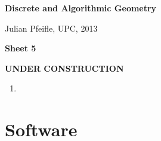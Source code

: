 \documentclass[11pt]{amsart}
\begin{document}
\begin{center}
\textbf{\sffamily
   Discrete and Algorithmic Geometry }

\medskip
   Julian Pfeifle,
   UPC, 2013 \mbox{}
\end{center}

\bigskip

\begin{center}
  \textbf{\sffamily Sheet 5}

\bigskip
\textbf{\sffamily UNDER CONSTRUCTION}

\end{center}

\bigskip




\begin{enumerate}
\setlength{\itemsep}{1ex}
\item 

\end{enumerate}

 \bigskip
 \section*{Software}
\end{document}
